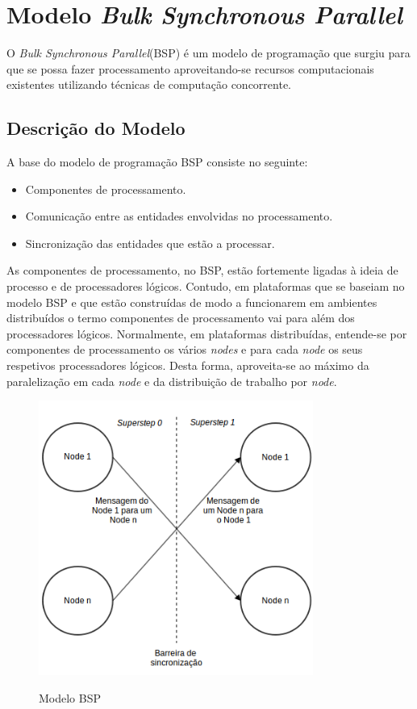 \chapter{Modelo \textit{Bulk Synchronous Parallel}}

O \textit{Bulk Synchronous Parallel}(BSP) é um modelo de programação que 
surgiu para que se possa fazer processamento aproveitando-se recursos 
computacionais existentes utilizando técnicas de computação concorrente.

\section{Descrição do Modelo}

A base do modelo de programação BSP consiste no seguinte:
\begin{itemize} 
 \item Componentes de processamento.
 \item Comunicação entre as entidades envolvidas no processamento.
 \item Sincronização das entidades que estão a processar.
\end{itemize}

As componentes de processamento, no BSP, estão fortemente ligadas à ideia de 
processo e de processadores lógicos. Contudo, em plataformas que se baseiam no 
modelo BSP e que estão construídas de modo a funcionarem em ambientes 
distribuídos o termo componentes de processamento vai para além dos 
processadores lógicos. Normalmente, em plataformas distribuídas, entende-se por 
componentes de processamento os vários \textit{nodes} e para cada \textit{node} 
os seus respetivos processadores lógicos. Desta forma, aproveita-se ao máximo 
da paralelização em cada \textit{node} e da distribuição de trabalho por 
\textit{node}.

\begin{figure}[H]
 \caption{Modelo BSP}
	\centering
 \includegraphics[width=90mm]{bspmodel.png}
 \label{fig:bspmodel}
\end{figure}

